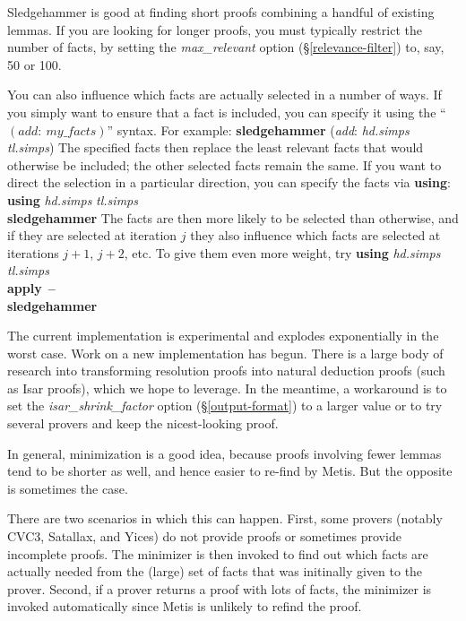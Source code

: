 \documentclass[a4paper,12pt]{article}
\begin{document}
Sledgehammer is good at finding short proofs combining a handful of existing
lemmas. If you are looking for longer proofs, you must typically restrict the
number of facts, by setting the \textit{max\_relevant} option
(\S\ref{relevance-filter}) to, say, 50 or 100.

You can also influence which facts are actually selected in a number of ways. If
you simply want to ensure that a fact is included, you can specify it using the
``$(\textit{add}{:}~\textit{my\_facts})$'' syntax. For example:
%
\prew
\textbf{sledgehammer} (\textit{add}: \textit{hd.simps} \textit{tl.simps})
\postw
%
The specified facts then replace the least relevant facts that would otherwise be
included; the other selected facts remain the same.
If you want to direct the selection in a particular direction, you can specify
the facts via \textbf{using}:
%
\prew
\textbf{using} \textit{hd.simps} \textit{tl.simps} \\
\textbf{sledgehammer}
\postw
%
The facts are then more likely to be selected than otherwise, and if they are
selected at iteration $j$ they also influence which facts are selected at
iterations $j + 1$, $j + 2$, etc. To give them even more weight, try
%
\prew
\textbf{using} \textit{hd.simps} \textit{tl.simps} \\
\textbf{apply}~\textbf{--} \\
\textbf{sledgehammer}
\postw


The current implementation is experimental and explodes exponentially in the
worst case. Work on a new implementation has begun. There is a large body of
research into transforming resolution proofs into natural deduction proofs (such
as Isar proofs), which we hope to leverage. In the meantime, a workaround is to
set the \textit{isar\_shrink\_factor} option (\S\ref{output-format}) to a larger
value or to try several provers and keep the nicest-looking proof.


In general, minimization is a good idea, because proofs involving fewer lemmas
tend to be shorter as well, and hence easier to re-find by Metis. But the
opposite is sometimes the case.


There are two scenarios in which this can happen. First, some provers (notably
CVC3, Satallax, and Yices) do not provide proofs or sometimes provide incomplete
proofs. The minimizer is then invoked to find out which facts are actually
needed from the (large) set of facts that was initinally given to the prover.
Second, if a prover returns a proof with lots of facts, the minimizer is invoked
automatically since Metis is unlikely to refind the proof.
\end{document}
